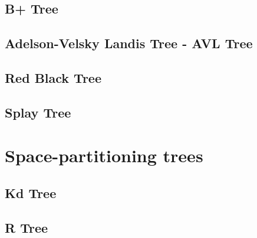 \subsection{B+ Tree}

\subsection{Adelson-Velsky Landis Tree - AVL Tree}
\subsection{Red Black Tree}
\subsection{Splay Tree}


\section{Space-partitioning trees}
\subsection{Kd Tree}
\subsection{R Tree}